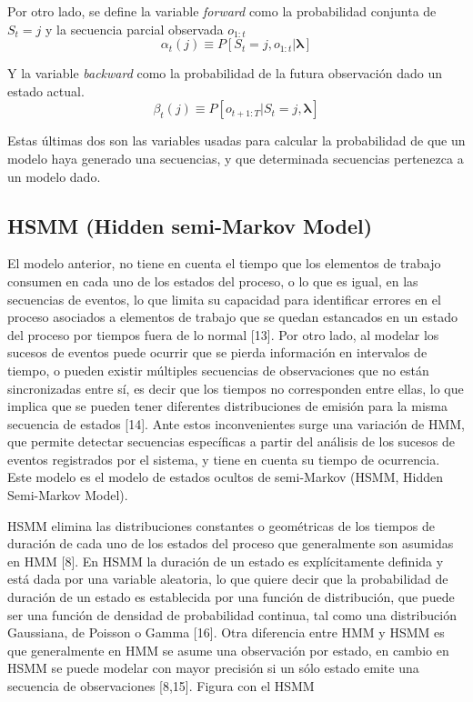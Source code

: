 Por otro lado, se define la variable \textit{forward} como la probabilidad conjunta de $S_{t}=j$ y la secuencia parcial observada $o_{1:t}$
  \begin{equation}
    \alpha_{t}(j) \equiv P \left[ S_{t} = j, o_{1:t} \vert \boldsymbol\lambda \right]
  \end{equation}

Y la variable \textit{backward} como la probabilidad de la futura observaci\'on dado un estado actual.
  \begin{equation}
    \beta_{t}(j) \equiv P \left[ o_{t+1:T} \vert S_{t} = j, \boldsymbol\lambda \right]
  \end{equation}

Estas últimas dos son las variables usadas para calcular la probabilidad de que un modelo haya generado una secuencias, y que determinada secuencias pertenezca a un modelo dado.

\subsection{HSMM (Hidden semi-Markov Model) }

El modelo anterior, no tiene en cuenta el tiempo que los elementos de trabajo consumen en cada uno de los estados del proceso, o lo que es igual, en las secuencias de eventos, lo que limita su capacidad para identificar errores en el proceso asociados a elementos de trabajo que se quedan estancados en un estado del proceso por tiempos fuera de lo normal [13]. Por otro lado, al modelar los sucesos de eventos puede ocurrir que se pierda información en intervalos de tiempo, o pueden existir múltiples secuencias de observaciones que no están sincronizadas entre sí, es decir que los tiempos no corresponden entre ellas, lo que implica que se pueden tener diferentes distribuciones de emisión para la misma secuencia de estados [14]. Ante estos inconvenientes surge una variación de HMM, que permite detectar secuencias específicas a partir del análisis de los sucesos de eventos registrados por el sistema, y tiene en cuenta su tiempo de ocurrencia. Este modelo es el modelo de estados ocultos de semi-Markov (HSMM, Hidden Semi-Markov Model).

HSMM elimina las distribuciones constantes o geométricas de los tiempos de duración de cada uno de los estados del proceso que generalmente son asumidas en HMM [8]. En HSMM la duración de un estado es explícitamente definida y está dada por una variable aleatoria, lo que quiere decir que la probabilidad de duración de un estado es establecida por una función de distribución, que puede ser una función de densidad de probabilidad continua, tal como una distribución Gaussiana, de Poisson o Gamma [16]. Otra diferencia entre HMM y HSMM es que generalmente en HMM se asume una observación por estado, en cambio en HSMM se puede modelar con mayor precisión si un sólo estado emite una secuencia de observaciones [8,15].
Figura con el HSMM

